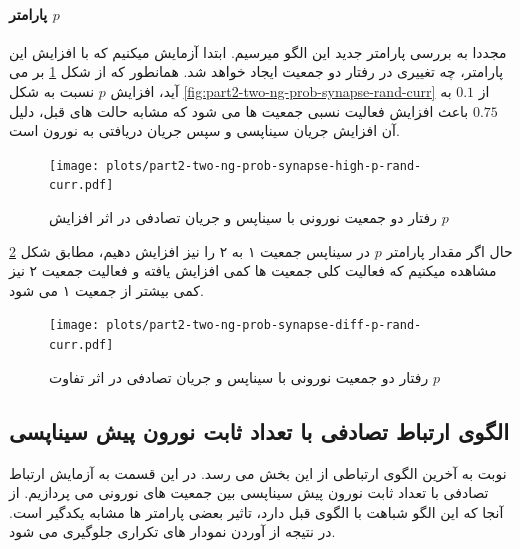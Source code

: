                 \paragraph*{پارامتر $p$}
                    مجددا به بررسی پارامتر جدید این الگو میرسیم. ابتدا آزمایش میکنیم که با افزایش این پارامتر، چه تغییری در رفتار دو جمعیت ایجاد خواهد شد. همانطور که از شکل 
                    \ref{fig:part2-two-ng-prob-synapse-high-p-rand-curr}
                    بر می آید، افزایش 
                    $p$ 
                    نسبت به شکل 
                    \ref{fig:part2-two-ng-prob-synapse-rand-curr}
                    از 
                    $0.1$ 
                    به 
                    $0.75$ 
                    باعث افزایش فعالیت نسبی جمعیت ها می شود که مشابه حالت های قبل، دلیل آن افزایش جریان سیناپسی و سپس جریان دریافتی به نورون است.
                    \begin{figure}[!ht]
                        \centering
                        \texttt{[image: plots/part2-two-ng-prob-synapse-high-p-rand-curr.pdf]} 
                        \caption{رفتار دو جمعیت نورونی با سیناپس و جریان تصادفی در اثر افزایش $p$}
                        \label{fig:part2-two-ng-prob-synapse-high-p-rand-curr}
                    \end{figure}
                    
                    حال اگر مقدار پارامتر 
                    $p$ 
                    در سیناپس جمعیت ۱ به ۲ را نیز افزایش دهیم، مطابق شکل
                    \ref{fig:part2-two-ng-prob-synapse-diff-p-rand-curr}
                    مشاهده میکنیم که فعالیت کلی جمعیت ها کمی افزایش یافته و فعالیت جمعیت ۲ نیز کمی بیشتر از جمعیت ۱ می شود.
                    \begin{figure}[!ht]
                        \centering
                        \texttt{[image: plots/part2-two-ng-prob-synapse-diff-p-rand-curr.pdf]} 
                        \caption{رفتار دو جمعیت نورونی با سیناپس و جریان تصادفی در اثر تفاوت $p$}
                        \label{fig:part2-two-ng-prob-synapse-diff-p-rand-curr}
                    \end{figure}
    
    \subsection{الگوی ارتباط تصادفی با تعداد ثابت نورون پیش سیناپسی }
        نوبت به آخرین الگوی ارتباطی از این بخش می رسد. در این قسمت به آزمایش ارتباط تصادفی با تعداد ثابت نورون پیش سیناپسی بین جمعیت های نورونی می پردازیم. از آنجا که این الگو شباهت با الگوی قبل دارد، تاثیر بعضی پارامتر ها مشابه یکدگیر است. در نتیجه از آوردن نمودار های تکراری جلوگیری می شود.

